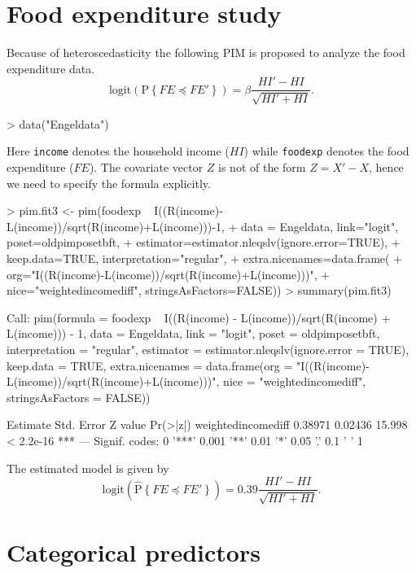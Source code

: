 \documentclass[12pt]{article}
\newcommand{\prob}[1]{\text{P}\left\{#1\right\}}
\newcommand{\hatprob}[1]{\hat{\text{P}}\left\{#1\right\}}
\newcommand{\leqs}{\preccurlyeq}
\begin{document}
\section{Food expenditure study}\label{S_fe}

Because of heteroscedasticity the following PIM is proposed to analyze the food expenditure data.
\[
\text{logit}\left( \prob{FE \leqs FE' } \right) = \beta \frac{HI' - HI}{\sqrt{HI' + HI}}.  
\]
\begin{Schunk}
\begin{Sinput}
> data("Engeldata")
\end{Sinput}
\end{Schunk}
Here \verb|income| denotes the household income ($HI$) while \verb|foodexp| denotes the food expenditure ($FE$). The covariate vector $Z$ is not of the form $Z = X' - X$, hence we need to specify the formula explicitly. 
\begin{Schunk}
\begin{Sinput}
> pim.fit3 <- pim(foodexp ~ I((R(income)-L(income))/sqrt(R(income)+L(income)))-1, 
+   data = Engeldata, link="logit", poset=oldpimposetbft, 
+   estimator=estimator.nleqslv(ignore.error=TRUE), 
+   keep.data=TRUE, interpretation="regular", 
+   extra.nicenames=data.frame(
+     org="I((R(income)-L(income))/sqrt(R(income)+L(income)))", 
+     nice="weightedincomediff", stringsAsFactors=FALSE))
> summary(pim.fit3)				
\end{Sinput}
\begin{Soutput}
Call:
pim(formula = foodexp ~ I((R(income) - L(income))/sqrt(R(income) + 
    L(income))) - 1, data = Engeldata, link = "logit", poset = oldpimposetbft, 
    interpretation = "regular", estimator = estimator.nleqslv(ignore.error = TRUE), 
    keep.data = TRUE, extra.nicenames = data.frame(org = "I((R(income)-L(income))/sqrt(R(income)+L(income)))", 
        nice = "weightedincomediff", stringsAsFactors = FALSE))

                   Estimate Std. Error Z value  Pr(>|z|)    
weightedincomediff  0.38971    0.02436  15.998 < 2.2e-16 ***
---
Signif. codes:  0 '***' 0.001 '**' 0.01 '*' 0.05 '.' 0.1 ' ' 1 
\end{Soutput}
\end{Schunk}
The estimated model is given by 
\[
\text{logit}\left( \hatprob{FE \leqs FE' } \right) =  0.39 \frac{HI' - HI}{\sqrt{HI' + HI}}.  
\]



\section{Categorical predictors}\label{S_categorical}
\end{document}
